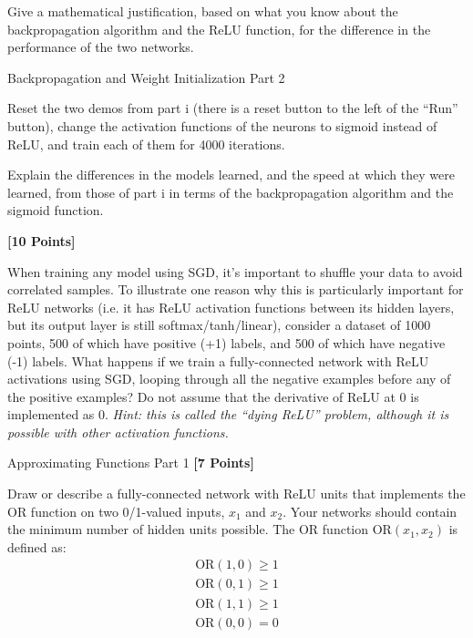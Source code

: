 Give a mathematical justification, based on what you know about the backpropagation algorithm and the ReLU function, for the difference in the performance of the two networks.

\begin{subsolution}

\end{subsolution}

\begin{problem}[5]
  Backpropagation and Weight Initialization Part 2
\end{problem}
Reset the two demos from part i (there is a reset button to the left of the ``Run'' button), change the activation functions of the neurons to sigmoid instead of ReLU, and train each of them for 4000 iterations.

Explain the differences in the models learned, and the speed at which they were learned, from those of part i in terms of the backpropagation algorithm and the sigmoid function.



\begin{subsolution}

\end{subsolution}



\problem \textbf{[10 Points]}

When training any model using SGD, it's important to shuffle your data to avoid correlated samples. To illustrate one reason why this is particularly important for ReLU networks (i.e. it has ReLU activation functions between its hidden layers, but its output layer is still softmax/tanh/linear), consider a dataset of 1000 points, 500 of which have positive (+1) labels, and 500 of which have negative (-1) labels. What happens if we train a fully-connected network with ReLU activations using SGD, looping through all the negative examples before any of the positive examples? Do not assume that the derivative of ReLU at 0 is implemented as 0. \textit{Hint: this is called the ``dying ReLU'' problem, although it is possible with other activation functions.}

\textit{}

\begin{solution}

\end{solution}



\problem Approximating Functions Part 1 \textbf{[7 Points]}

Draw or describe a fully-connected network with ReLU units that implements the OR function on two 0/1-valued inputs,  $x_1$ and $x_2$.  Your networks should contain the minimum number of hidden units possible.  The OR function $\text{OR}(x_1, x_2)$ is defined as:
\begin{gather*}
\text{OR}(1, 0) \geq 1 \\
\text{OR}(0, 1) \geq 1 \\
\text{OR}(1, 1) \geq 1 \\
\text{OR}(0, 0) = 0
\end{gather*}


